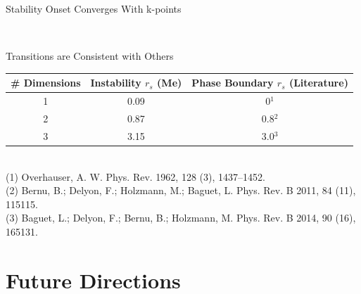 \documentclass[10pt]{beamer}
\begin{document}
{{{{{{{{{{{\begin{frame}{Stability Onset Converges With k-points}
  \centering 
  \begin{overprint}
  	\\
  	\centering
	\end{overprint}
\end{frame}



{%
\begin{frame}{Transitions are Consistent with Others}
  \centering
  \begin{tabular}{ c | c | c } 
  \# Dimensions & Instability $r_s$ (Me) & Phase Boundary $r_s$ (Literature) \\
  \hline
  1 & 0.09 & 0$^1$ \\ 
  2 & 0.87  & 0.8$^2$ \\ 
  3 & 3.15  & 3.0$^3$ \\ 
  \end{tabular}\\
  \vspace{5mm}
  \scriptsize
  (1) Overhauser, A. W. Phys. Rev. 1962, 128 (3), 1437–1452. \\
  (2) Bernu, B.; Delyon, F.; Holzmann, M.; Baguet, L. Phys. Rev. B 2011, 84 (11), 115115.\\
  (3) Baguet, L.; Delyon, F.; Bernu, B.; Holzmann, M. Phys. Rev. B 2014, 90 (16), 165131.
\end{frame}

\section{Future Directions}

}}}}}}}}}}}}
\end{document}
